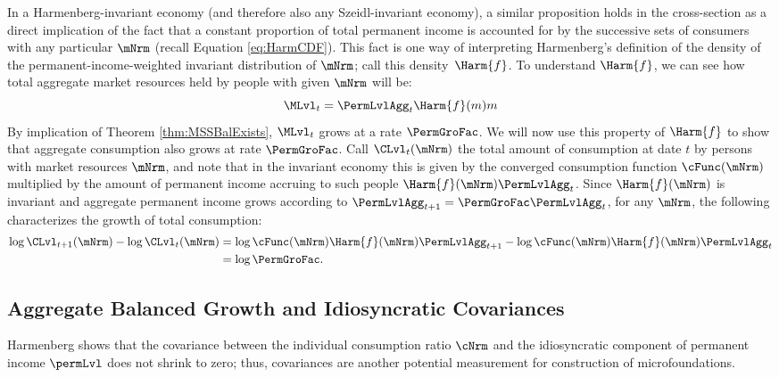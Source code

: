 \documentclass[BufferStockTheory]{subfiles}
\begin{document}
In a Harmenberg-invariant economy (and therefore also any Szeidl-invariant economy), a similar proposition holds in the cross-section as a direct implication of the fact that a constant proportion of total permanent income is accounted for by the successive sets of consumers with any particular $\mNrm$ (recall Equation \eqref{eq:HarmCDF}).
This fact is one way of interpreting Harmenberg's definition of the density of the permanent-income-weighted invariant distribution of $\mNrm$; call this density~$\Harm{f}$.
To understand $\Harm{f}$, we can see how total aggregate market resources held by people with given $\mNrm$ will be:
%
%
\begin{equation}
\MLvl_{t}=\PermLvlAgg_{t}\Harm{f}(m)m
\end{equation}
%
%
By implication of Theorem \ref{thm:MSSBalExists}, $\MLvl_{t}$ grows at a rate $\PermGroFac$.
We will now use this property of $\Harm{f}$ to show that aggregate consumption also grows at rate $\PermGroFac$.
Call $\CLvl_{t}(\mNrm)$ the total amount of consumption at date $t$ by persons with market resources $\mNrm$, and note that in the invariant economy this is given by the converged consumption function $\cFunc(\mNrm)$ multiplied by the amount of permanent income accruing to such people $\Harm{f}(\mNrm)\PermLvlAgg_{t}$.
Since $\Harm{f}(\mNrm)$ is invariant and aggregate permanent income grows according to $\PermLvlAgg_{t+1} = \PermGroFac \PermLvlAgg_{t}$, for any $\mNrm$, the following characterizes the growth of total consumption:
%
%
\begin{equation*}
  \begin{split}
    \log \CLvl_{t+1}(\mNrm) - \log \CLvl_{t}(\mNrm) &  \notag
    = \log \cFunc(\mNrm) \Harm{f}(\mNrm)\PermLvlAgg_{t+1} - \log \cFunc(\mNrm)\Harm{f}(\mNrm)\PermLvlAgg_{t} \\
    & = \log \PermGroFac.
  \end{split}
\end{equation*}



\hypertarget{Balanced-Growth-Of-Covariances}{}
\subsection{Aggregate Balanced Growth and Idiosyncratic Covariances}\label{subsec:Covariances}

Harmenberg shows that the covariance between the individual consumption ratio $\cNrm$ and the idiosyncratic component of permanent income $\permLvl$ does not shrink to zero; thus, covariances are another potential measurement for construction of microfoundations.
\end{document}
